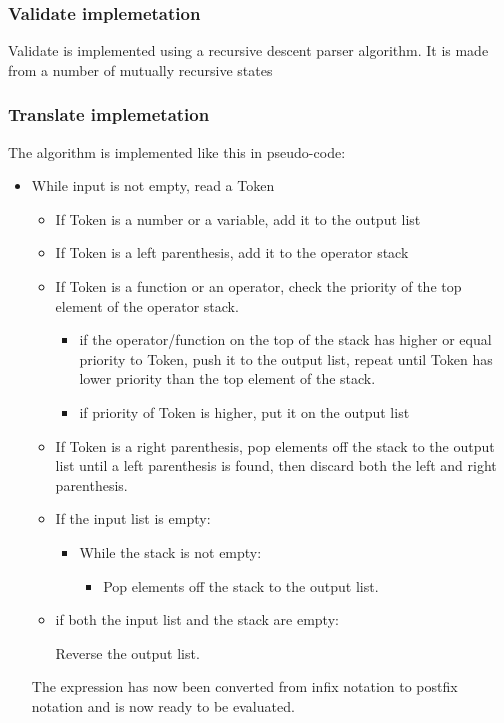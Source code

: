 \documentclass[12pt,a4paper]{article}
\begin{document}
\subsubsection{Validate implemetation}
\textnormal{
Validate is implemented using a recursive descent parser algorithm.
It is made from a number of mutually recursive states
}
\subsubsection{Translate implemetation}
\textnormal{
The algorithm is implemented like this in pseudo-code:
}

\begin{itemize}
  \item While input is not empty, read a Token
\begin{itemize}
    \item If Token is a number or a variable, add it to the output list
    \item If Token is a left parenthesis, add it to the operator stack
    \item If Token is a function or an operator, check the priority of the top element of the operator stack.
    \begin{itemize}
      \item if the operator/function on the top of the stack has higher or equal priority to Token, 
      push it to the output list, repeat until Token has lower priority than the top element of the stack.
      \item if priority of Token is higher, put it on the output list
    \end{itemize}
    \item If Token is a right parenthesis, pop elements off the stack to the output list until a left 
    parenthesis is found, then discard both the left and right parenthesis.
    \item If the input list is empty:
    \begin{itemize}
      \item While the stack is not empty:
      \begin{itemize}
        \item Pop elements off the stack to the output list.
      \end{itemize}
    \end{itemize}
    \item if both the input list and the stack are empty:
    \begin{itemize}
      Reverse the output list.
    \end{itemize}
\end{itemize}
\textnormal{
  The expression has now been converted from infix notation to postfix notation and is now ready to be evaluated.
  \newline
  \newline
}


\end{itemize}
\end{document}
